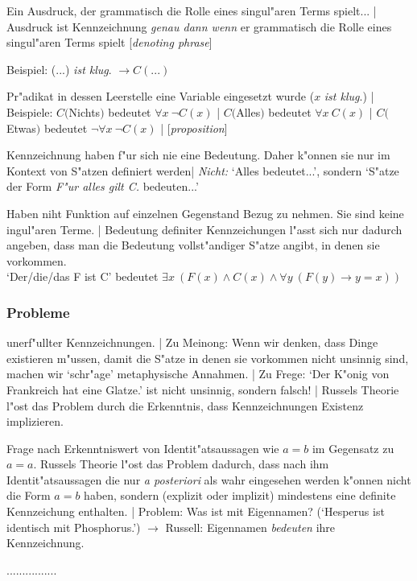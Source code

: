 \documentclass[]{scrartcl}
\begin{document}
\begin{description}[leftmargin=!,labelwidth=\widthof{\bfseries Gebrauchsdefinition}]
    \item[Kennzeichnung] Ein Ausdruck, der grammatisch die Rolle eines singul"aren Terms spielt... | Ausdruck ist Kennzeichnung \emph{genau dann wenn} er grammatisch die Rolle eines singul"aren Terms spielt [\emph{denoting phrase}]
    \item[Pr"adikat] Beispiel: (...) \emph{ist klug}. $\rightarrow C(...)$
    \item[Aussage] Pr"adikat in dessen Leerstelle eine Variable eingesetzt wurde ($x$ \emph{ist klug}.) | Beispiele: $C($Nichts$)$ bedeutet $\forall x~\neg C(x)$ | $C($Alles$)$ bedeutet $\forall x~C(x)$ | $C($Etwas$)$ bedeutet $\neg \forall x~\neg C(x)$ | [\emph{proposition}]
    \item[Gebrauchsdefinition] Kennzeichnung haben f"ur sich nie eine Bedeutung. Daher k"onnen sie nur im Kontext von S"atzen definiert werden| \emph{Nicht:} `Alles bedeutet...', sondern `S"atze der Form \emph{F"ur alles gilt C.} bedeuten...'  
    \item[Definite Kennz.]Haben niht Funktion auf einzelnen Gegenstand Bezug zu nehmen. Sie sind keine ingul"aren Terme. | Bedeutung definiter Kennzeichungen l"asst sich nur dadurch angeben, dass man die Bedeutung vollst"andiger S"atze angibt, in denen sie vorkommen.\\`Der/die/das F ist C' bedeutet $\exists x~(F(x) \wedge C(x) \wedge \forall y~(F(y) \rightarrow y = x) )$
\end{description}

\subsubsection{Probleme}

\begin{description}[leftmargin=!,labelwidth=\widthof{\bfseries Probl. des Bezugs}]
    \item[Probl. des Bezugs] unerf"ullter Kennzeichnungen. | Zu Meinong: Wenn wir denken, dass Dinge existieren m"ussen, damit die S"atze in denen sie vorkommen nicht unsinnig sind, machen wir `schr"age' metaphysische Annahmen. | Zu Frege: `Der K"onig von Frankreich hat eine Glatze.' ist nicht unsinnig, sondern falsch! | Russels Theorie l"ost das Problem durch die Erkenntnis, dass Kennzeichnungen Existenz implizieren.
    \item[Freges R"atsel] Frage nach Erkenntniswert von Identit"atsaussagen wie $a = b$ im Gegensatz zu $a = a$. Russels Theorie l"ost das Problem dadurch, dass nach ihm Identit"atsaussagen die nur \emph{a posteriori} als wahr eingesehen werden k"onnen nicht die Form $a = b$ haben, sondern (explizit oder implizit) mindestens eine definite Kennzeichung enthalten. | Problem: Was ist mit Eigennamen? (`Hesperus ist identisch mit Phosphorus.') $\rightarrow$ Russell: Eigennamen \emph{bedeuten} ihre Kennzeichnung.
    \item[...] ................
\end{description}
\end{document}
